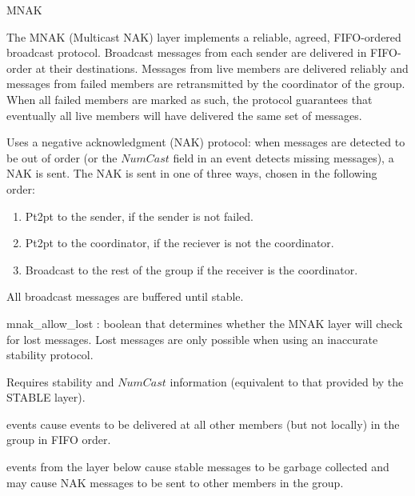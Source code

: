 %
%
%
\begin{Layer}{MNAK}

The MNAK (Multicast NAK) layer implements a reliable, agreed, FIFO-ordered
broadcast protocol.  Broadcast messages from each sender are delivered in
FIFO-order at their destinations.  Messages from live members are delivered
reliably and messages from failed members are retransmitted by the coordinator
of the group.  When all failed members are marked as such, the protocol
guarantees that eventually all live members will have delivered the same set of
messages.

\begin{Protocol}
Uses a negative acknowledgment (NAK) protocol: when messages are detected
to be out of order (or the $NumCast$ field in an  event detects
missing messages), a NAK is sent.  The NAK is sent in one of three ways,
chosen in the following order:
\begin{enumerate}
\item Pt2pt to the sender, if the sender is not failed.
\item Pt2pt to the coordinator, if the reciever is not the coordinator.
\item Broadcast to the rest of the group if the receiver is the
  coordinator.
\end{enumerate}
All broadcast messages are buffered until stable.
\end{Protocol}

\begin{Parameters}
\item mnak\_allow\_lost : boolean that determines whether the MNAK layer will
check for lost messages.  Lost messages are only possible when using an
inaccurate stability protocol.
\end{Parameters}

\begin{Properties}
\item
Requires stability and $NumCast$ information (equivalent to that provided
by the STABLE layer).
\item
{} events cause  events to be delivered at all other members
(but not locally) in the group in FIFO order.
\item
{} events from the layer below cause stable messages to be garbage
collected and may cause NAK messages to be sent to other members in the
group.
\end{Properties}


\end{Layer}
